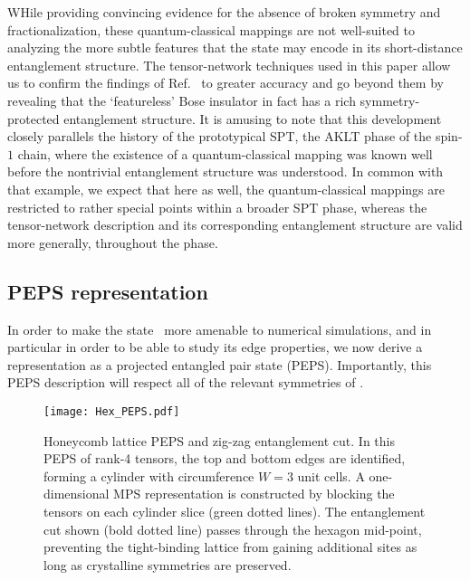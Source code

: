 {WHile providing convincing evidence for the absence of broken symmetry and fractionalization, these quantum-classical mappings are not well-suited to analyzing the more subtle features that the state may encode in its short-distance entanglement structure. The tensor-network techniques used in this paper allow us to confirm the findings of Ref.~ to greater accuracy  and go beyond them by revealing that the `featureless' Bose insulator in fact has a rich symmetry-protected entanglement structure.  It is amusing to note that this development closely parallels the history of the prototypical SPT, the AKLT phase of the spin-$1$ chain, where the existence of a quantum-classical mapping was known well before the nontrivial entanglement structure was understood. In common with that example, we expect that here as well, the quantum-classical mappings are restricted to rather special points within a broader SPT phase, whereas the tensor-network description and its corresponding entanglement structure are valid more generally, throughout the phase.



\subsection{PEPS representation}

In order to make the state~ more amenable to numerical
simulations, and in particular in order to be able to study its edge
properties, we now derive a representation as a projected entangled
pair state (PEPS). Importantly, this PEPS description will respect
all of the relevant symmetries of .

\begin{figure}
	\centering
	\texttt{[image: Hex\_PEPS.pdf]}
	\caption{Honeycomb lattice PEPS and zig-zag entanglement cut.
	In this PEPS of rank-4 tensors, the top and bottom edges are identified, forming a cylinder with circumference $W=3$ unit cells. 	
	A one-dimensional MPS representation is constructed by blocking the tensors on each cylinder slice (green dotted lines).
	The entanglement cut shown (bold dotted line) passes through the hexagon mid-point, preventing the tight-binding lattice from gaining additional sites as long as crystalline symmetries are preserved. 
	}
	\label{fig:PEPS}
\end{figure}

}

